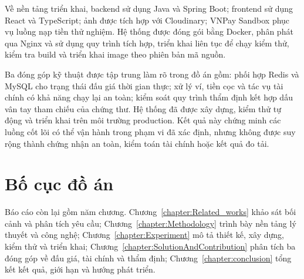 \documentclass[../DoAn.tex]{subfiles}
\begin{document}
Về nền tảng triển khai, backend sử dụng Java và Spring Boot; frontend sử dụng React và TypeScript; ảnh được tích hợp với Cloudinary; VNPay Sandbox phục vụ luồng nạp tiền thử nghiệm. Hệ thống được đóng gói bằng Docker, phân phát qua Nginx và sử dụng quy trình tích hợp, triển khai liên tục để chạy kiểm thử, kiểm tra build và triển khai image theo phiên bản mã nguồn.

Ba đóng góp kỹ thuật được tập trung làm rõ trong đồ án gồm: phối hợp Redis và MySQL cho trạng thái đấu giá thời gian thực; xử lý ví, tiền cọc và tác vụ tài chính có khả năng chạy lại an toàn; kiểm soát quy trình thẩm định kết hợp dấu vân tay tham chiếu của chứng thư. Hệ thống đã được xây dựng, kiểm thử tự động và triển khai trên môi trường production. Kết quả này chứng minh các luồng cốt lõi có thể vận hành trong phạm vi đã xác định, nhưng không được suy rộng thành chứng nhận an toàn, kiểm toán tài chính hoặc kết quả đo tải.

\section{Bố cục đồ án}
\label{section:1.4}

Báo cáo còn lại gồm năm chương. Chương~\ref{chapter:Related_works} khảo sát bối cảnh và phân tích yêu cầu; Chương~\ref{chapter:Methodology} trình bày nền tảng lý thuyết và công nghệ; Chương~\ref{chapter:Experiment} mô tả thiết kế, xây dựng, kiểm thử và triển khai; Chương~\ref{chapter:SolutionAndContribution} phân tích ba đóng góp về đấu giá, tài chính và thẩm định; Chương~\ref{chapter:conclusion} tổng kết kết quả, giới hạn và hướng phát triển.
\end{document}

